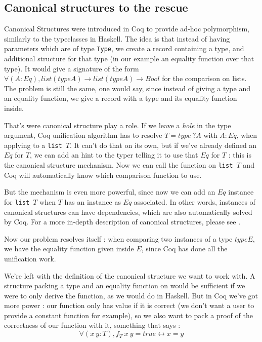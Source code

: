 \documentclass{article}
\begin{document}
\subsection{Canonical structures to the rescue}

Canonical Structures were introduced in Coq to provide ad-hoc polymorphism,
similarly to the typeclasses in Haskell. The idea is that instead of having
parameters which are of type \texttt{Type}, we create a record containing
a type, and additional structure for that type (in our example an equality
function over that type). It would give a signature of the form
$\forall (A : Eq), list (type A) \rightarrow list (type A) \rightarrow Bool$ for the comparison
on lists. The problem is still the same, one would say, since instead of
giving a type and an equality function, we give a record with a type and its
equality function inside.

That's were canonical structure play a role. If we leave a \emph{hole} in the
type argument, Coq unification algorithm has to resolve $T = type\ ?A$ with
$A : Eq$, when applying to a \texttt{list $T$}. It can't do that on its own,
but if we've already defined an $Eq$ for $T$, we can add an hint to the typer
telling it to use that $Eq$ for $T$ : this is the canonical structure mechanism.
Now we can call the function on \texttt{list $T$} and Coq will automatically
know which comparison function to use.

But the mechanism is even more powerful, since now we can add an $Eq$ instance
for \texttt{list $T$} when $T$ has an instance as $Eq$ associated. In other
words, instances of canonical structures can have dependencies, which are
also automatically solved by Coq. For a more in-depth description of canonical
structures, please see \cite{CSCoq13}.

Now our problem resolves itself : when comparing two instances of a type $type E$,
we have the equality function given inside $E$, since Coq has done all the
unification work.

We're left with the definition of the canonical structure we want to work with.
A structure packing a type and an equality function on would be sufficient
if we were to only derive the function, as we would do in Haskell. But in Coq
we've got more power : our function only has value if it is correct (we don't
want a user to provide a constant function for example), so we also want to
pack a proof of the correctness of our function with it, something that
says :
\[\forall (x\ y : T), f_T\ x\ y = true \leftrightarrow x = y\]
\end{document}
